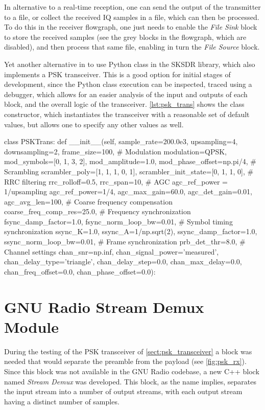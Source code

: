In alternative to a real-time reception, one can send the output of the transmitter to a file, or collect the received IQ samples in a file, which can then be processed. To do this in the receiver flowgraph, one just needs to enable the \emph{File Sink} block to store the received samples (see the grey blocks in the flowgraph, which are disabled), and then process that same file, enabling in turn the \emph{File Source} block.

Yet another alternative in to use  Python class in the SKSDR library, which also implements a PSK transceiver. This is a good option for initial stages of development, since the Python class execution can be inspected, traced using a debugger, which allows for an easier analysis of the input and outputs of each block, and the overall logic of the transceiver. \autoref{lst:psk_trans} shows the  class constructor, which instantiates the transceiver with a reasonable set of default values, but allows one to specify any other values as well.

\begin{python}[label={lst:psk_trans},caption={\code{PSKTrans} class in the SKSDR library}]
class PSKTrans:
def __init__(self, sample_rate=200.0e3, upsampling=4, downsampling=2, frame_size=100,
  # Modulation
  modulation=QPSK, mod_symbols=[0, 1, 3, 2], mod_amplitude=1.0, mod_phase_offset=np.pi/4,
  # Scrambling
  scrambler_poly=[1, 1, 1, 0, 1], scrambler_init_state=[0, 1, 1, 0],
  # RRC filtering
  rrc_rolloff=0.5, rrc_span=10,
  # AGC agc_ref_power = 1/upsampling
  agc_ref_power=1/4, agc_max_gain=60.0, agc_det_gain=0.01, agc_avg_len=100,
  # Coarse frequency compensation
  coarse_freq_comp_res=25.0,
  # Frequency synchronization
  fsync_damp_factor=1.0, fsync_norm_loop_bw=0.01,
  # Symbol timing synchronization
  ssync_K=1.0, ssync_A=1/np.sqrt(2), ssync_damp_factor=1.0, ssync_norm_loop_bw=0.01,
  # Frame synchronization
  prb_det_thr=8.0,
  # Channel settings
  chan_snr=np.inf, chan_signal_power='measured',
  chan_delay_type='triangle', chan_delay_step=0.0, chan_max_delay=0.0,
  chan_freq_offset=0.0, chan_phase_offset=0.0):
\end{python}

\section{GNU Radio Stream Demux Module}
\label{sect:gr_stream_demux}

During the testing of the PSK transceiver of \autoref{sect:psk_transceiver} a block was needed that would separate the preamble from the payload (see \autoref{fig:psk_rx}). Since this block was not available in the GNU Radio codebase, a new C++ block named \emph{Stream Demux} was developed. This block, as the name implies, separates the input stream into a number of output streams, with each output stream having a distinct number of samples.


